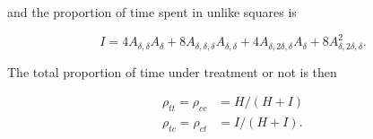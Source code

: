 \documentclass[11pt]{amsart}
\begin{document}
\noindent and the proportion of time spent in unlike squares is

\begin{equation}
I = 4 A_{\delta,\delta}A_\delta + 8 A_{\delta,\delta,\delta} A_{\delta,\delta} + 4 A_{\delta,2\delta,\delta} A_\delta + 8 A_{\delta,2\delta,\delta}^2 .
\end{equation}

\noindent The total proportion of time under treatment or not is then

\begin{align}
\rho_{tt} = \rho_{cc} &= H / (H+I) \\
\rho_{tc} = \rho_{ct} &= I / (H+I) .
\end{align}
\end{document}
